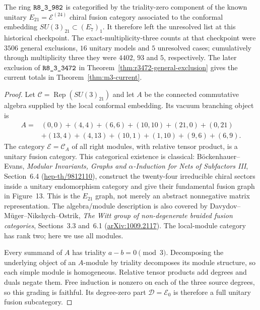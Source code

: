\begin{theorem}
\label{thm:creative-e21-model}
The ring $\sha{R8_3_982}$ is categorified by the triality-zero component
of the known unitary $E_{21}=\mathcal E^{(24)}$ chiral fusion category
associated to the conformal embedding $SU(3)_{21}\subset(E_7)_1$.
It therefore left the unresolved list at this historical checkpoint.
The exact-multiplicity-three counts at that checkpoint were $3506$ general exclusions, $16$ unitary models and
$5$ unresolved cases; cumulatively through multiplicity three they were
$4402$, $93$ and $5$, respectively. The later exclusion of $\sha{R8_3_3472}$ in Theorem~\ref{thm:r3472-general-exclusion} gives the current totals in Theorem~\ref{thm:m3-current}.
\end{theorem}
\begin{proof}
Let $\mathcal C=\operatorname{Rep}(SU(3)_{21})$ and let $A$ be the
connected commutative algebra supplied by the local conformal embedding.
Its vacuum branching object is
\[
\begin{split}
 A={}&(0,0)+(4,4)+(6,6)+(10,10)+(21,0)+(0,21)\\
    &+(13,4)+(4,13)+(10,1)+(1,10)+(9,6)+(6,9).
\end{split}
\]
The category $\mathcal E=\mathcal C_A$ of all right modules, with
relative tensor product, is a unitary fusion category. This categorical
existence is classical: B\"ockenhauer--Evans,
\emph{Modular Invariants, Graphs and $\alpha$-Induction for Nets of
Subfactors III}, Section~6.4
(\href{https://arxiv.org/abs/hep-th/9812110}{hep-th/9812110}),
construct the twenty-four irreducible chiral sectors inside a unitary
endomorphism category and give their fundamental fusion graph in
Figure~13. This is the $E_{21}$ graph, not merely an abstract
nonnegative matrix representation. The algebra/module description is
also covered by Davydov--M\"uger--Nikshych--Ostrik,
\emph{The Witt group of non-degenerate braided fusion categories},
Sections~3.3 and~6.1
(\href{https://arxiv.org/abs/1009.2117}{arXiv:1009.2117}).
The local-module category has rank two; here we use all modules.

Every summand of $A$ has triality $a-b=0\pmod3$. Decomposing the
underlying object of an $A$-module by triality decomposes its module
structure, so each simple module is homogeneous. Relative tensor
products add degrees and duals negate them. Free induction is nonzero
on each of the three source degrees, so this grading is faithful.
Its degree-zero part $\mathcal D=\mathcal E_0$ is therefore a full
unitary fusion subcategory.


\end{proof}
